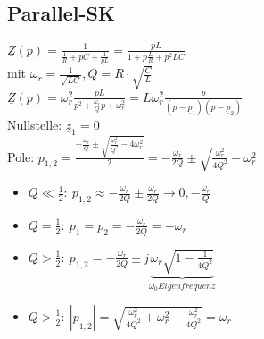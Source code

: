 \subsection{Parallel-SK}

$\underline{Z}(p)=\frac{1}{\frac{1}{R}+pC+\frac{1}{pL}}=\frac{pL}{1+p\frac{L}{R}+p^2LC}$\\
mit $\omega_r=\frac{1}{\sqrt{LC}}, Q=R\cdot\sqrt{\frac{C}{L}}$\\
$\underline{Z}(p)=\omega_r^2\frac{pL}{p^2+\frac{\omega_r}{Q}p+\omega_r^2}=L\omega_r^2
\frac{p}{(p-\underline{p}_1)(p-\underline{p}_2)}$\\
Nullstelle: $\underline{z}_1=0$\\
Pole:
$p_{1,2}=\frac{-\frac{\omega_r}{Q}\pm\sqrt{\frac{\omega_r^2}{Q^2}-4\omega_r^2}}{2}=-\frac{\omega_r}{2Q}\pm\sqrt{\frac{\omega_r^2}{4Q^2}-\omega_r^2}$\\
\begin{itemize}
  \item $Q\ll\frac{1}{2}:\
  p_{1,2}\approx-\frac{\omega_r}{2Q}\pm\frac{\omega_r}{2Q}\rightarrow 0,
  -\frac{\omega_r}{Q}$
  \item $Q=\frac{1}{2}:\ p_1=p_2=-\frac{\omega_r}{2Q}=-\omega_r$
  \item $Q>\frac{1}{2}:\ p_{1,2}=-\frac{\omega_r}{2Q}\pm
  j\underbrace{\omega_r\sqrt{1-\frac{1}{4Q^2}}}_{\omega_0 Eigenfrequenz}$
  \item $Q>\frac{1}{2}:\ 
  |\underline{p}_{1,2}|=\sqrt{\frac{\omega_r^2}{4Q^2}+\omega_r^2-\frac{\omega_r^2}{4Q^2}}=\omega_r$
\end{itemize}

